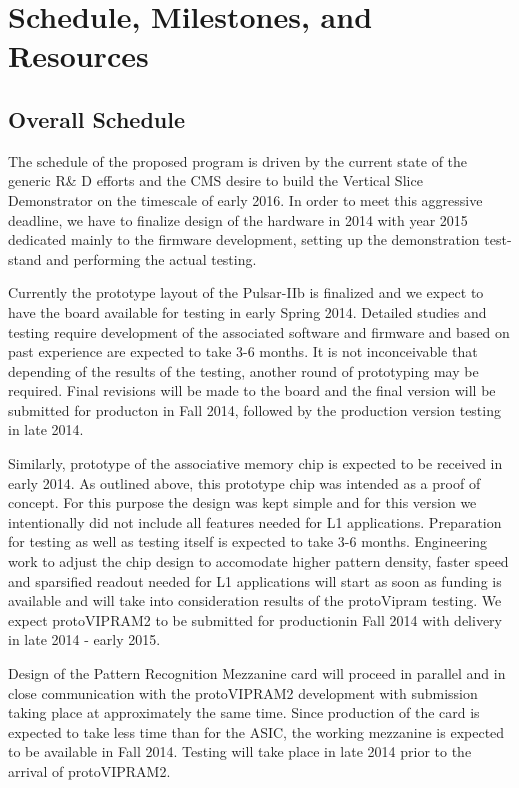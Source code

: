 \section{Schedule, Milestones, and Resources}
\subsection{Overall Schedule}
The schedule of the proposed program is driven by the current state of the generic R\& D efforts and the CMS desire to build the Vertical Slice Demonstrator on the timescale of early 2016.  In order to meet this aggressive deadline, we have to finalize design of the hardware in 2014 with year 2015 dedicated mainly to the firmware development, setting up the demonstration test-stand and performing the actual testing.  

Currently the prototype layout of the Pulsar-IIb is finalized and we expect to have the board available for testing in early Spring 2014.  Detailed studies and testing require development of the associated software and firmware and based on past experience are expected to take 3-6 months. It is not inconceivable that depending of the results of the testing, another round of prototyping may be required. Final revisions will be made to the board and the final version will be submitted for producton in Fall 2014, followed by the production version testing in late 2014. 

Similarly, prototype of the associative memory chip is expected to be received in early 2014. As outlined above, this prototype chip was intended as a proof of concept. For this purpose the design was kept simple and for this version we intentionally did not include all features needed for L1 applications. Preparation for testing as well as testing itself is expected to take 3-6 months. Engineering work to adjust the chip design to accomodate higher pattern density, faster speed and sparsified readout needed for L1 applications will start as soon as funding is available and will take into consideration results of the protoVipram testing. We expect protoVIPRAM2 to be submitted for productionin Fall 2014 with delivery in late 2014 - early 2015. 

Design of the Pattern Recognition Mezzanine card will proceed in parallel and in close communication with the protoVIPRAM2 development with submission taking place at approximately the same time.  Since production of the card is expected to take less time than for the ASIC, the working mezzanine is expected to be available in Fall 2014. Testing will take place in late 2014 prior to the arrival of protoVIPRAM2.

